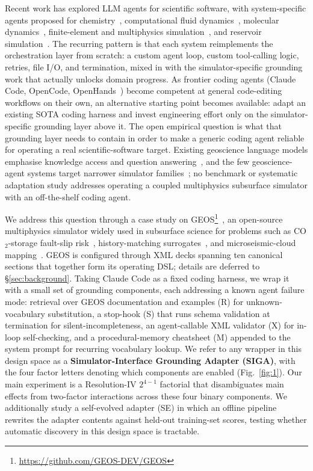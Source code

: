 \documentclass{article}
\begin{document}
Recent work has explored LLM agents for scientific software, with system-specific agents proposed for chemistry~\citep{bran2024chemcrow,boiko2023coscientist}, computational fluid dynamics~\citep{chen2024metaopenfoam,yue2025foamagent,pandey2025openfoamgpt}, molecular dynamics~\citep{shi2026mdagent2,zhao2026polyjarvis,guilbert2025dynamate}, finite-element and multiphysics simulation~\citep{zhan2025mooseagent,mcpsim2026,ni2024mechagents}, and reservoir simulation~\citep{moyner2026jutulgpt}. The recurring pattern is that each system reimplements the orchestration layer from scratch: a custom agent loop, custom tool-calling logic, retries, file I/O, and termination, mixed in with the simulator-specific grounding work that actually unlocks domain progress. As frontier coding agents (Claude Code, OpenCode, OpenHands~\citep{wang2024openhands}) become competent at general code-editing workflows on their own, an alternative starting point becomes available: adapt an existing SOTA coding harness and invest engineering effort only on the simulator-specific grounding layer above it. The open empirical question is what that grounding layer needs to contain in order to make a generic coding agent reliable for operating a real scientific-software target. Existing geoscience language models emphasise knowledge access and question answering~\citep{deng2023k2,lin2024geogalactica}, and the few geoscience-agent systems target narrower simulator families~\citep{bekele2025geosim,li2025seismologyagent,moyner2026jutulgpt}; no benchmark or systematic adaptation study addresses operating a coupled multiphysics subsurface simulator with an off-the-shelf coding agent.

We address this question through a case study on GEOS\footnote{\url{https://github.com/GEOS-DEV/GEOS}}~\citep{geos2024}, an open-source multiphysics simulator widely used in subsurface science for problems such as CO$_2$-storage fault-slip risk~\citep{he2026faultslip}, history-matching surrogates~\citep{han2024accelerated}, and microseismic-cloud mapping~\citep{glubokovskikh2023microseismic}. GEOS is configured through XML decks spanning ten canonical sections that together form its operating DSL; details are deferred to \S\ref{sec:background}. Taking Claude Code as a fixed coding harness, we wrap it with a small set of grounding components, each addressing a known agent failure mode: retrieval over GEOS documentation and examples (R) for unknown-vocabulary substitution, a stop-hook (S) that runs schema validation at termination for silent-incompleteness, an agent-callable XML validator (X) for in-loop self-checking, and a procedural-memory cheatsheet (M) appended to the system prompt for recurring vocabulary lookup. We refer to any wrapper in this design space as a \textbf{Simulator-Interface Grounding Adapter (SIGA)}, with the four factor letters denoting which components are enabled (Fig.~\ref{fig:1}). Our main experiment is a Resolution-IV $2^{4-1}$ factorial that disambiguates main effects from two-factor interactions across these four binary components. We additionally study a self-evolved adapter (SE) in which an offline pipeline rewrites the adapter contents against held-out training-set scores, testing whether automatic discovery in this design space is tractable.
\end{document}

